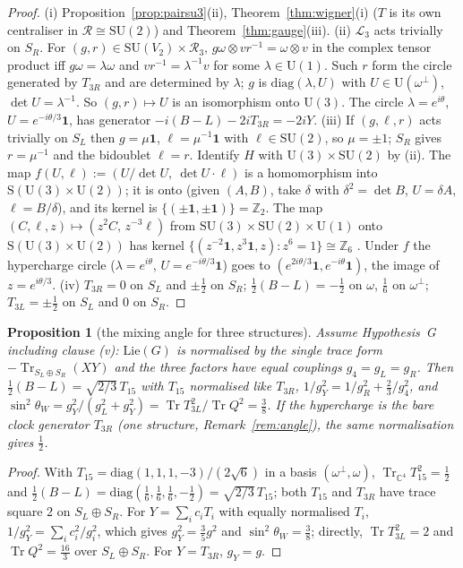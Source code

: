 \documentclass[aps,pra,onecolumn,superscriptaddress,nofootinbib,10pt]{revtex4-2}
\newtheorem{proposition}[theorem]{Proposition}
\theoremstyle{definition}
\theoremstyle{remark}
\newcommand{\C}{\mathbb{C}}
\newcommand{\Z}{\mathbb{Z}}
\newcommand{\cL}{\mathcal{L}}
\newcommand{\cR}{\mathcal{R}}
\newcommand{\tr}{\operatorname{Tr}}
\newcommand{\SU}{\mathrm{SU}}
\newcommand{\U}{\mathrm{U}}
\begin{document}
\begin{proof}
(i) Proposition~\ref{prop:pairsu3}(ii), Theorem~\ref{thm:wigner}(i) ($T$ is its own centraliser in
$\cR\cong\SU(2)$) and Theorem~\ref{thm:gauge}(iii).
(ii) $\cL_3$ acts trivially on $S_R$.  For $(g,r)\in\SU(V_2)\times\cR_3$, $g\omega\otimes vr^{-1}=\omega\otimes v$ in
the complex tensor product iff $g\omega=\lambda\omega$ and $vr^{-1}=\lambda^{-1}v$ for some $\lambda\in\U(1)$.
Such $r$ form the circle generated by $T_{3R}$ and are determined by $\lambda$; $g$ is
$\mathrm{diag}(\lambda,U)$ with $U\in\U(\omega^\perp)$, $\det U=\lambda^{-1}$.  So $(g,r)\mapsto U$ is an
isomorphism onto $\U(3)$.  The circle $\lambda=e^{i\theta}$, $U=e^{-i\theta/3}\mathbf1$, has generator
$-i(B-L)-2iT_{3R}=-2iY$.
(iii) If $(g,\ell,r)$ acts trivially on $S_L$ then $g=\mu\mathbf1$, $\ell=\mu^{-1}\mathbf1$ with
$\ell\in\SU(2)$, so $\mu=\pm1$; $S_R$ gives $r=\mu^{-1}$ and the bidoublet $\ell=r$.  Identify $H$ with
$\U(3)\times\SU(2)$ by (ii).  The map $f(U,\ell):=(U/\det U,\ \det U\cdot\ell)$ is a homomorphism into
$\mathrm S(\U(3)\times\U(2))$; it is onto (given $(A,B)$, take $\delta$ with $\delta^2=\det B$, $U=\delta A$,
$\ell=B/\delta$), and its kernel is $\{(\pm\mathbf1,\pm\mathbf1)\}=\Z_2$.  The map
$(C,\ell,z)\mapsto(z^2C,\,z^{-3}\ell)$ from $\SU(3)\times\SU(2)\times\U(1)$ onto
$\mathrm S(\U(3)\times\U(2))$ has kernel $\{(z^{-2}\mathbf1,z^3\mathbf1,z):z^6=1\}\cong\Z_6$ \cite{BaezHuerta}.  Under
$f$ the hypercharge circle ($\lambda=e^{i\theta}$, $U=e^{-i\theta/3}\mathbf1$) goes to
$(e^{2i\theta/3}\mathbf1,e^{-i\theta}\mathbf1)$, the image of $z=e^{i\theta/3}$.
(iv) $T_{3R}=0$ on $S_L$ and $\pm\frac12$ on $S_R$; $\frac12(B-L)=-\frac12$ on $\omega$, $\frac16$ on
$\omega^\perp$; $T_{3L}=\pm\frac12$ on $S_L$ and $0$ on $S_R$.
\end{proof}

\begin{proposition}[the mixing angle for three structures]\label{prop:angle38}
Assume Hypothesis~G including clause (v): $\mathrm{Lie}(G)$ is normalised by the single trace form
$-\tr_{S_L\oplus S_R}(XY)$ and the three factors have equal couplings $g_4=g_L=g_R$.  Then $\tfrac12(B-L)=\sqrt{2/3}\,T_{15}$ with $T_{15}$
normalised like $T_{3R}$, $1/g_Y^2=1/g_R^2+\tfrac23/g_4^2$, and
$\sin^2\theta_W=g_Y^2/(g_L^2+g_Y^2)=\tr T_{3L}^2/\tr Q^2=\tfrac38$.  If the hypercharge is the bare clock
generator $T_{3R}$ (one structure, Remark~\ref{rem:angle}), the same normalisation gives $\tfrac12$.
\end{proposition}
\begin{proof}
With $T_{15}=\mathrm{diag}(1,1,1,-3)/(2\sqrt6)$ in a basis $(\omega^\perp,\omega)$, $\tr_{\C^4}T_{15}^2=\tfrac12$
and $\tfrac12(B-L)=\mathrm{diag}(\tfrac16,\tfrac16,\tfrac16,-\tfrac12)=\sqrt{2/3}\,T_{15}$; both $T_{15}$ and
$T_{3R}$ have trace square $2$ on $S_L\oplus S_R$.  For $Y=\sum_ic_iT_i$ with equally normalised $T_i$,
$1/g_Y^2=\sum_ic_i^2/g_i^2$, which gives $g_Y^2=\tfrac35g^2$ and $\sin^2\theta_W=\tfrac38$; directly,
$\tr T_{3L}^2=2$ and $\tr Q^2=\tfrac{16}3$ over $S_L\oplus S_R$.  For $Y=T_{3R}$, $g_Y=g$.
\end{proof}
\end{document}
